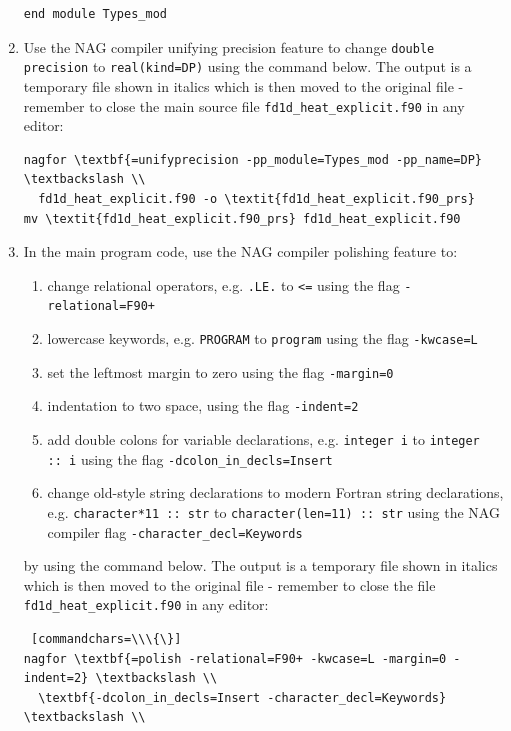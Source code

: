 \documentclass[12pt]{article}
\begin{document}
\begin{enumerate}
\begin{lstlisting}
end module Types_mod
\end{lstlisting} 
\item Use the NAG compiler unifying precision feature to change \texttt{double precision} to \texttt{real(kind=DP)}
  using the command below. The output is a temporary file shown in italics which is then moved to the original file -
  remember to close the main source file \texttt{fd1d\_heat\_explicit.f90} in any editor:
\begin{Verbatim}[commandchars=\\\{\}]
nagfor \textbf{=unifyprecision -pp_module=Types_mod -pp_name=DP} \textbackslash \\
  fd1d_heat_explicit.f90 -o \textit{fd1d_heat_explicit.f90_prs}
mv \textit{fd1d_heat_explicit.f90_prs} fd1d_heat_explicit.f90
\end{Verbatim}
\item In the main program code, use the NAG compiler polishing feature to:
\begin{enumerate}
\item change relational operators, e.g. \texttt{.LE.} to \texttt{<=} using the flag \texttt{-relational=F90+}
\item lowercase keywords, e.g. \texttt{PROGRAM} to \texttt{program} using the flag \texttt{-kwcase=L}
\item set the leftmost margin to zero using the flag \texttt{-margin=0}
\item indentation to two space, using the flag \texttt{-indent=2}
\item add double colons for variable declarations, e.g. \texttt{integer i} to \texttt{integer ::\ i} using the flag
  \texttt{-dcolon\_in\_decls=Insert}
\item change old-style string declarations to modern Fortran string declarations, e.g. \texttt{character*11 ::\ str} to
\texttt{character(len=11) ::\ str} using the NAG compiler flag \texttt{-character\_decl=Keywords}
\end{enumerate}
by using the command below. The output is a temporary file shown in italics which is then moved to the original file
- remember to close the file \texttt{fd1d\_heat\_explicit.f90} in any editor:
\begin{Verbatim} [commandchars=\\\{\}]
nagfor \textbf{=polish -relational=F90+ -kwcase=L -margin=0 -indent=2} \textbackslash \\
  \textbf{-dcolon_in_decls=Insert -character_decl=Keywords} \textbackslash \\

\end{Verbatim}
\end{enumerate}
\end{document}
